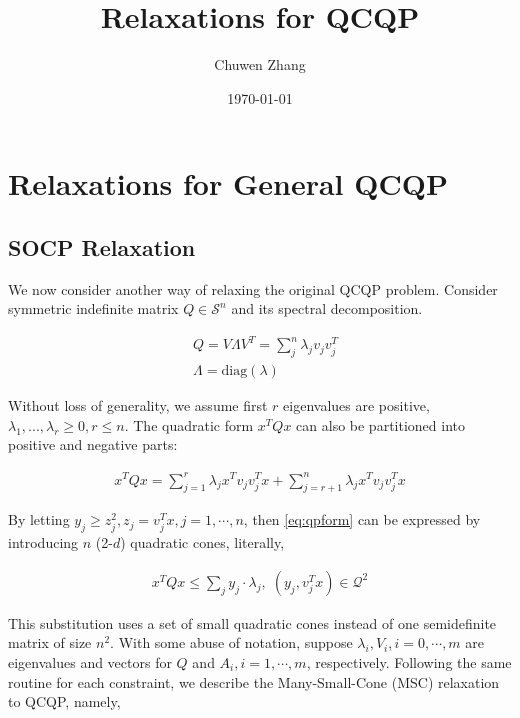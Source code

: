 \documentclass[../main]{subfiles}
\title{Relaxations for QCQP}
\author{Chuwen Zhang}
\date{\today}
\begin{document}
\maketitle
{
  \setcounter{tocdepth}{3}
  \tableofcontents
}

\section{Relaxations for General QCQP}


\subsection{SOCP Relaxation}

We now consider another way of relaxing the original QCQP problem. Consider symmetric indefinite matrix \(Q \in \mathcal{S}^n\) and its spectral decomposition.

\begin{equation}
  \begin{aligned}
     & Q = V\Lambda V ^T =\sum_j^n \lambda_j v_j  v_j^T \\
     & \Lambda = \mathrm{diag}(\lambda)
  \end{aligned}
\end{equation}

Without loss of generality, we assume first \(r\) eigenvalues are positive, \(\lambda_1, ..., \lambda_r \ge 0, r\le n \). The quadratic form \(x^TQx\) can also be partitioned into positive and negative parts:

\begin{equation}\label{eq:qpform}
  \begin{aligned}
    x^TQx = \sum_{j=1}^r \lambda_j x^T v_j v_j^T x + \sum_{j=r+1}^n \lambda_j x^T v_j v_j^T x
  \end{aligned}
\end{equation}

By letting \(y_j \ge z_j^2, z_j = v_j^T x, j = 1, \cdots, n\), then \eqref{eq:qpform} can be expressed by introducing \(n\) (2-\(d\)) quadratic cones, literally,

\begin{equation}
  \begin{aligned}
    x^TQx \le \sum_j y_j \cdot \lambda_j,\; (y_j, v^T_j x) \in \mathcal{Q}^2
  \end{aligned}
\end{equation}

This substitution uses a set of small quadratic cones instead of one semidefinite matrix of size \(n^2\). With some abuse of notation, suppose \(\lambda_i, V_i, i = 0, \cdots, m\) are eigenvalues and vectors for \(Q\) and \(A_i, i = 1,
\cdots, m\), respectively. Following the same routine for each constraint, we describe the Many-Small-Cone (MSC) relaxation to QCQP, namely,
\end{document}
